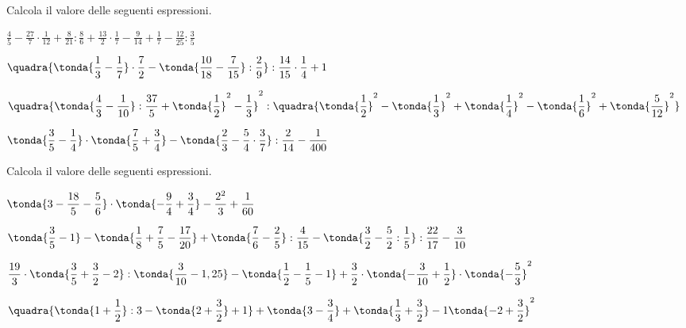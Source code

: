 \begin{esercizio}[*]
\label{ese:3.146}
Calcola il valore delle seguenti espressioni.
\begin{enumeratees}
\spazielenx
\item \(\displaystyle{\frac{4}{5}-\frac{27}{7}\cdot{\frac{1}{12}}+
\frac{8}{21}:\frac{8}{6}+\frac{13}{2}\cdot
\frac{1}{7}-\frac{9}{14}+\frac{1}{7}-\frac{12}{25}:\frac{3}{5}}\)
\item \(\displaystyle{\quadra{\tonda{\frac{1}{3}-\frac{1}{7}}\cdot
{\frac{7}{2}}-\tonda{\frac{10}{18}-\frac{7}{15}}:\frac{2}{9}}:
\frac{14}{15}\cdot{\frac{1}{4}}+1}\)
\item \(\displaystyle{\quadra{\tonda{\frac{4}{3}-\frac{1}{10}}:
\frac{37}{5}+\tonda{\frac{1}{2}}^{2}-\frac{1}{3}%
}^{2}:\quadra{\tonda{\frac{1}{2}}^{2}-\tonda{\frac{1}{3}}^{2}+
\tonda{\frac{1}{4}}^{2}-%
\tonda{\frac{1}{6}}^{2}+\tonda{\frac{5}{12}}^{2}}}\)
\item \(\displaystyle{\tonda{\frac{3}{5}-\frac{1}{4}}\cdot
\tonda{\frac{7}{5}+\frac{3}{4}}-\tonda{\frac{2}{3}-%
\frac{5}{4}\cdot\frac{3}{7}}:\frac{2}{14}-\frac{1}{400}}\)
\end{enumeratees}
\end{esercizio}

\begin{esercizio}[*]
\label{ese:3.147}
 Calcola il valore delle seguenti espressioni.
\begin{enumeratees}
\spazielenx
\item \(\displaystyle{\tonda{3-\frac{18}{5}-\frac{5}{6}}\cdot%
\tonda{-{\frac{9}{4}}+\frac{3}{4}}-\frac{2^{2}}{3}+\frac{1}{60}}\)
\item 
\(\displaystyle{\tonda{\frac{3}{5}-1}-\tonda{\frac{1}{8}+\frac{7}{5}-
\frac{17}{20}}+%
\tonda{\frac{7}{6}-\frac{2}{5}}:\frac{4}{15}-\tonda{\frac{3}{2}-\frac{5}{
2}
:
\frac{1}{5}}:\frac{22}{17}-%
\frac{3}{10}}\)
\item \(\displaystyle{\frac{19}{3}\cdot\tonda{\frac{3}{5}+\frac{3}{2}-2}:
\tonda{\frac{3}{10}-1,25}-%
\tonda{\frac{1}{2}-\frac{1}{5}-1}+\frac{3}{2}\cdot\tonda{-{\frac{3}{10}}+
\frac{1}{2}}\cdot%
\tonda{-{\frac{5}{3}}}^{2}}\)
\item \(\displaystyle{\quadra{\tonda{1+\frac{1}{2}}:3-\tonda{2+
\frac{3}{2}}+1}+\tonda{3-\frac{3}{4}}%
+\tonda{\frac{1}{3}+\frac{3}{2}}-1\tonda{-2+\frac{3}{2}}^{2}}\)
\end{enumeratees}
\end{esercizio}


